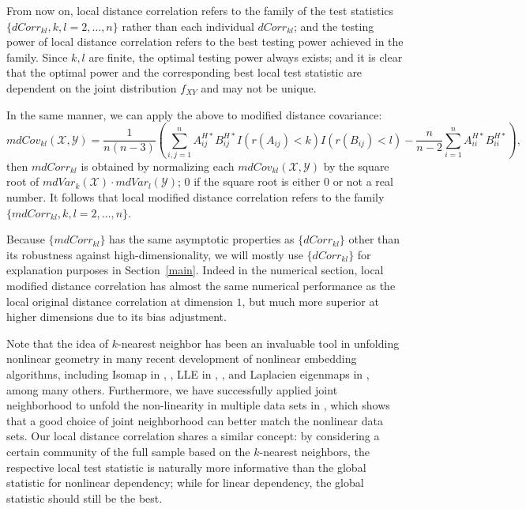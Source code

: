 \documentclass[12pt]{article}
\begin{document}
From now on, local distance correlation refers to the family of the test statistics $\{dCorr_{kl}, k,l=2,\ldots,n\}$ rather than each individual $dCorr_{kl}$; and the testing power of local distance correlation refers to the best testing power achieved in the family. Since $k,l$ are finite, the optimal testing power always exists; and it is clear that the optimal power and the corresponding best local test statistic are dependent on the joint distribution $f_{XY}$ and may not be unique.

In the same manner, we can apply the above to modified distance covariance:
\begin{equation}
\label{localmdCovEqu}
mdCov_{kl}(\mathcal{X},\mathcal{Y})=\frac{1}{n(n-3)}(\sum_{i,j=1}^{n}A^{H*}_{ij}B^{H*}_{ij}I(r(A_{ij})<k)I(r(B_{ij})<l)-\frac{n}{n-2}\sum_{i=1}^{n}A^{H*}_{ii}B^{H*}_{ii}),
\end{equation}
then $mdCorr_{kl}$ is obtained by normalizing each $mdCov_{kl}(\mathcal{X},\mathcal{Y})$ by the square root of $mdVar_{k}(\mathcal{X}) \cdot mdVar_{l}(\mathcal{Y})$; $0$ if the square root is either $0$ or not a real number. It follows that local modified distance correlation refers to the family $\{mdCorr_{kl}, k,l=2,\ldots,n\}$.

Because $\{mdCorr_{kl}\}$ has the same asymptotic properties as $\{dCorr_{kl}\}$ other than its robustness against high-dimensionality, we will mostly use $\{dCorr_{kl}\}$ for explanation purposes in Section~\ref{main}. Indeed in the numerical section, local modified distance correlation has almost the same numerical performance as the local original distance correlation at dimension $1$, but much more superior at higher dimensions due to its bias adjustment.

Note that the idea of $k$-nearest neighbor has been an invaluable tool in unfolding nonlinear geometry in many recent development of nonlinear embedding algorithms, including Isomap in \cite{TenenbaumSilvaLangford2000}, \cite{SilvaTenenbaum2003}, LLE in \cite{SaulRoweis2000}, \cite{RoweisSaul2003}, and Laplacien eigenmaps in \cite{BelkinNiyogi2003}, among many others. Furthermore, we have successfully applied joint neighborhood to unfold the non-linearity in multiple data sets in \cite{ShenVogelsteinPriebe2015}, which shows that a good choice of joint neighborhood can better match the nonlinear data sets. Our local distance correlation shares a similar concept: by considering a certain community of the full sample based on the $k$-nearest neighbors, the respective local test statistic is naturally more informative than the global statistic for nonlinear dependency; while for linear dependency, the global statistic should still be the best.
\end{document}
